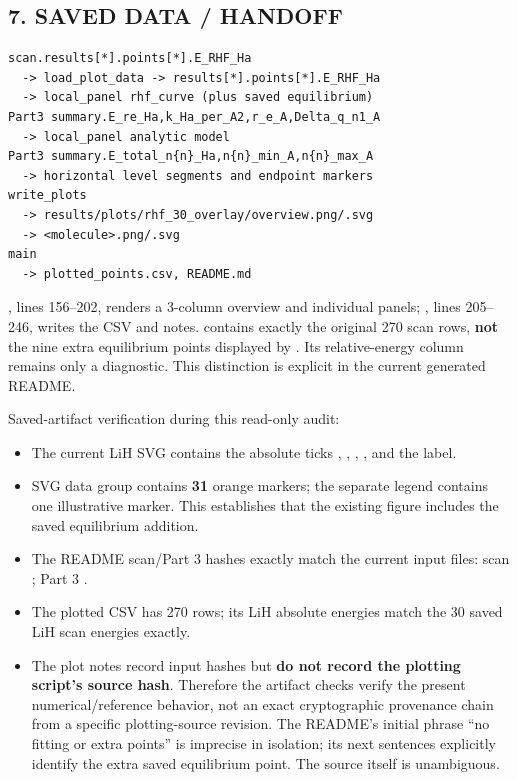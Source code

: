 \documentclass[10pt,a4paper]{article}
\begin{document}
\subsection{7. SAVED DATA / HANDOFF}
\begin{Verbatim}
scan.results[*].points[*].E_RHF_Ha
  -> load_plot_data -> results[*].points[*].E_RHF_Ha
  -> local_panel rhf_curve (plus saved equilibrium)
Part3 summary.E_re_Ha,k_Ha_per_A2,r_e_A,Delta_q_n1_A
  -> local_panel analytic model
Part3 summary.E_total_n{n}_Ha,n{n}_min_A,n{n}_max_A
  -> horizontal level segments and endpoint markers
write_plots
  -> results/plots/rhf_30_overlay/overview.png/.svg
  -> <molecule>.png/.svg
main
  -> plotted_points.csv, README.md
\end{Verbatim}
, lines 156–202, renders a 3-column overview and individual panels; , lines 205–246, writes the CSV and notes.  contains exactly the original 270 scan rows, \textbf{not} the nine extra equilibrium points displayed by . Its relative-energy column remains only a diagnostic. This distinction is explicit in the current generated README.

Saved-artifact verification during this read-only audit:

\begin{itemize}
\item The current LiH SVG contains the absolute ticks , , , ,  and the  label.
\item SVG data group  contains \textbf{31} orange markers; the separate legend contains one illustrative marker. This establishes that the existing figure includes the saved equilibrium addition.
\item The README scan/Part 3 hashes exactly match the current input files: scan ; Part 3 .
\item The plotted CSV has 270 rows; its LiH absolute energies match the 30 saved LiH scan energies exactly.
\item The plot notes record input hashes but \textbf{do not record the plotting script's source hash}. Therefore the artifact checks verify the present numerical/reference behavior, not an exact cryptographic provenance chain from a specific plotting-source revision. The README's initial phrase “no fitting or extra points” is imprecise in isolation; its next sentences explicitly identify the extra saved equilibrium point. The source itself is unambiguous.
\end{itemize}
\end{document}
